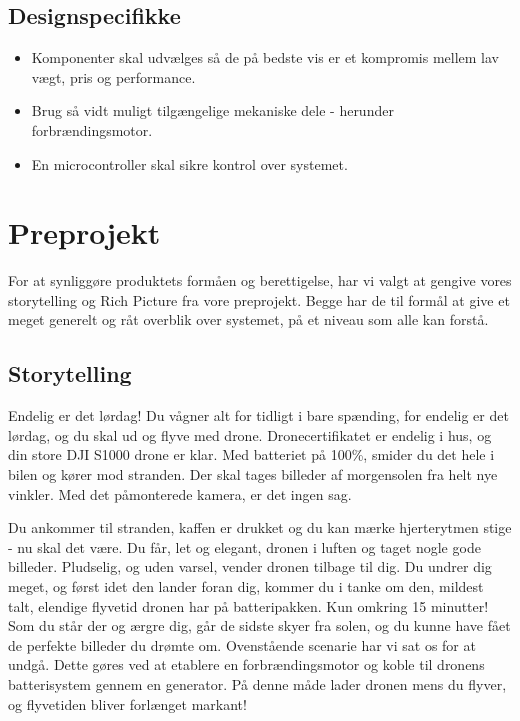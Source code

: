 \subsection{Designspecifikke }
\label{sec:designspecifikke-}

\begin{itemize}
\item Komponenter skal udvælges så de på bedste vis er et kompromis mellem lav vægt, pris og performance.
\item Brug så vidt muligt tilgængelige mekaniske dele - herunder forbrændingsmotor. 
\item En microcontroller skal sikre kontrol over systemet.
\end{itemize}

\section{Preprojekt}
\label{sec:preprojekt-}

For at synliggøre produktets formåen og berettigelse, har vi valgt at gengive vores storytelling og Rich Picture fra vore preprojekt. Begge har de til formål at give et meget generelt og råt overblik over systemet, på et niveau som alle kan forstå.

\subsection{Storytelling}
\label{sec:storytelling-}

Endelig er det lørdag! Du vågner alt for tidligt i bare spænding, for endelig er det lørdag, og du skal ud og flyve med drone. Dronecertifikatet er endelig i hus, og din store DJI S1000 drone er klar. Med batteriet på 100\%, smider du det hele i bilen og kører mod stranden. Der skal tages billeder af morgensolen fra helt nye vinkler. Med det påmonterede kamera, er det ingen sag.

Du ankommer til stranden, kaffen er drukket og du kan mærke hjerterytmen stige - nu skal det være. Du får, let og elegant, dronen i luften og taget nogle gode billeder. Pludselig, og uden varsel, vender dronen tilbage til dig. Du undrer dig meget, og først idet den lander foran dig, kommer du i tanke om den, mildest talt, elendige flyvetid dronen har på batteripakken. Kun omkring 15 minutter! Som du står der og ærgre dig, går de sidste skyer fra solen, og du kunne have fået de perfekte billeder du drømte om. 
Ovenstående scenarie har vi sat os for at undgå. Dette gøres ved at etablere en forbrændingsmotor og koble til dronens batterisystem gennem en generator. På denne måde lader dronen mens du flyver, og flyvetiden bliver forlænget markant!

